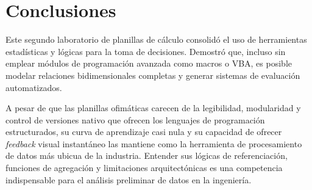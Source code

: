 \documentclass[11pt]{article}
\begin{document}
\section{Conclusiones}

Este segundo laboratorio de planillas de cálculo consolidó el uso de herramientas estadísticas y lógicas para la toma de decisiones. Demostró que, incluso sin emplear módulos de programación avanzada como macros o VBA, es posible modelar relaciones bidimensionales completas y generar sistemas de evaluación automatizados.

A pesar de que las planillas ofimáticas carecen de la legibilidad, modularidad y control de versiones nativo que ofrecen los lenguajes de programación estructurados, su curva de aprendizaje casi nula y su capacidad de ofrecer \textit{feedback} visual instantáneo las mantiene como la herramienta de procesamiento de datos más ubicua de la industria. Entender sus lógicas de referenciación, funciones de agregación y limitaciones arquitectónicas es una competencia indispensable para el análisis preliminar de datos en la ingeniería.
\end{document}
